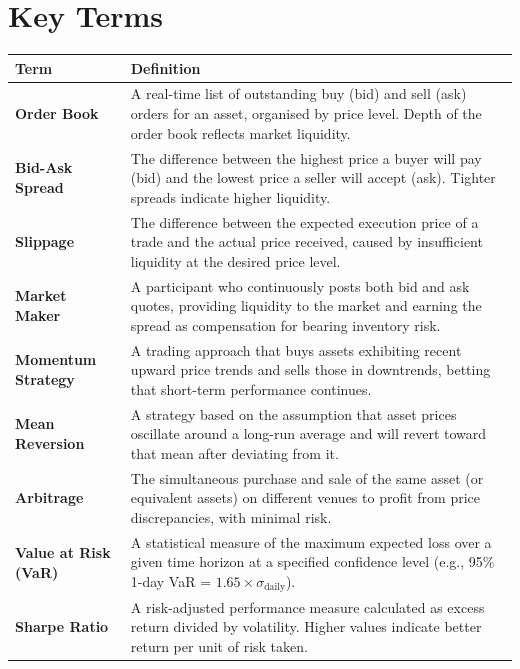 \documentclass[11pt,a4paper]{article}
\begin{document}
\vspace{4pt}

\section{Key Terms}

\renewcommand{\arraystretch}{1.25}
\noindent\begin{tabular}{@{}p{3.6cm}p{11.0cm}@{}}
\toprule
\textbf{Term} & \textbf{Definition} \\
\midrule
\textbf{Order Book}              & A real-time list of outstanding buy (bid) and sell (ask) orders for an asset, organised by price level. Depth of the order book reflects market liquidity. \\
\textbf{Bid-Ask Spread}          & The difference between the highest price a buyer will pay (bid) and the lowest price a seller will accept (ask). Tighter spreads indicate higher liquidity. \\
\textbf{Slippage}                & The difference between the expected execution price of a trade and the actual price received, caused by insufficient liquidity at the desired price level. \\
\textbf{Market Maker}            & A participant who continuously posts both bid and ask quotes, providing liquidity to the market and earning the spread as compensation for bearing inventory risk. \\
\textbf{Momentum Strategy}       & A trading approach that buys assets exhibiting recent upward price trends and sells those in downtrends, betting that short-term performance continues. \\
\textbf{Mean Reversion}          & A strategy based on the assumption that asset prices oscillate around a long-run average and will revert toward that mean after deviating from it. \\
\textbf{Arbitrage}               & The simultaneous purchase and sale of the same asset (or equivalent assets) on different venues to profit from price discrepancies, with minimal risk. \\
\textbf{Value at Risk (VaR)}     & A statistical measure of the maximum expected loss over a given time horizon at a specified confidence level (e.g., 95\% 1-day VaR = $1.65 \times \sigma_{\text{daily}}$). \\
\textbf{Sharpe Ratio}            & A risk-adjusted performance measure calculated as excess return divided by volatility. Higher values indicate better return per unit of risk taken. \\

\end{tabular}
\end{document}
